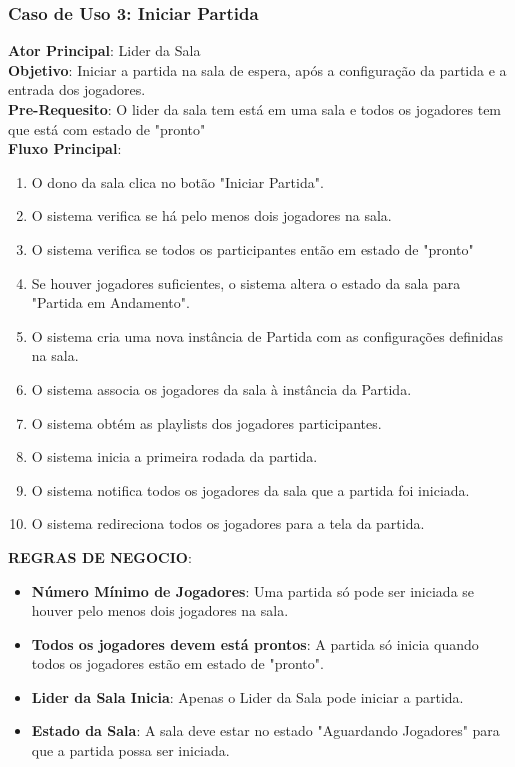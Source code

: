 \subsubsection{Caso de Uso 3: Iniciar Partida}
    \textbf{Ator Principal}: Lider da Sala \\
    \textbf{Objetivo}: Iniciar a partida na sala de espera, após a configuração da partida e a entrada dos jogadores. \\
    \textbf{Pre-Requesito}: O lider da sala tem está em uma sala e todos os jogadores tem que está com estado de "pronto" \\
    \textbf{Fluxo Principal}: \\
    \begin{enumerate}
        \item O dono da sala clica no botão "Iniciar Partida".
        \item O sistema verifica se há pelo menos dois jogadores na sala.
        \item O sistema verifica se todos os participantes então em estado de "pronto"
        \item Se houver jogadores suficientes, o sistema altera o estado da sala para "Partida em Andamento".
        \item O sistema cria uma nova instância de Partida com as configurações definidas na sala.
        \item O sistema associa os jogadores da sala à instância da Partida.
        \item O sistema obtém as playlists dos jogadores participantes.
        \item O sistema inicia a primeira rodada da partida.
        \item O sistema notifica todos os jogadores da sala que a partida foi iniciada.
        \item O sistema redireciona todos os jogadores para a tela da partida.
    \end{enumerate}

    \textbf{REGRAS DE NEGOCIO}:
    \begin{itemize}
        \item \textbf{Número Mínimo de Jogadores}: Uma partida só pode ser iniciada se houver pelo menos dois jogadores na sala.
        \item \textbf{Todos os jogadores devem está prontos}: A partida só inicia quando todos os jogadores estão em estado de "pronto".
        \item \textbf{Lider da Sala Inicia}: Apenas o Lider da Sala pode iniciar a partida.
        \item \textbf{Estado da Sala}: A sala deve estar no estado "Aguardando Jogadores" para que a partida possa ser iniciada.
    \end{itemize}
